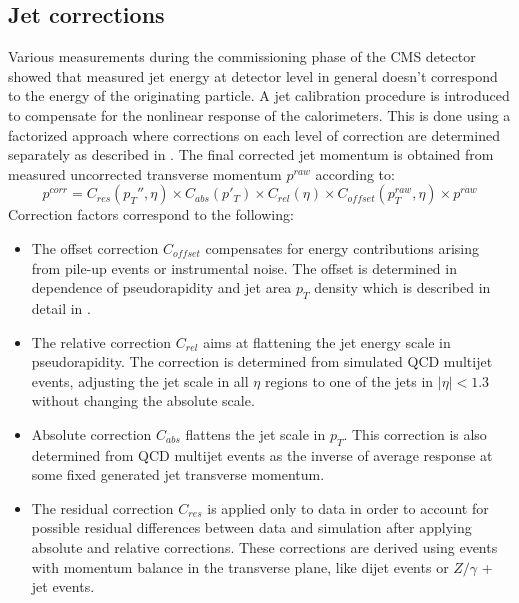 
\subsection{Jet corrections}
\label{sec:jetCorr}

Various measurements during the commissioning phase of the CMS detector showed that measured jet energy at detector level in general doesn't correspond to the energy of the originating particle. A jet calibration procedure is introduced to compensate for the nonlinear response of the calorimeters. This is done using a factorized approach where corrections on each level of correction are determined separately as described in \cite{Chatrchyan:2011ds}. The final corrected jet momentum is obtained from measured uncorrected transverse momentum $p^{raw}$ according to:
\begin{equation}
p^{corr} =  C_{res}(p_T'',\eta)\times  C_{abs}(p'_T) \times C_{rel}(\eta) \times C_{offset}(p_T^{raw},\eta)\times p^{raw}
\end{equation}  
Correction factors correspond to the following:
\begin{itemize}
\item The offset correction $C_{offset}$ compensates for energy contributions arising from pile-up events or instrumental noise. The offset is determined in dependence of pseudorapidity and jet area $p_T$ density which is described in detail in \cite{Cacciari2008119}.
\item The relative correction $C_{rel}$ aims at flattening the jet energy scale in pseudorapidity. The correction is determined from simulated QCD multijet events, adjusting the jet scale in all $\eta$ regions to one of the jets in $|\eta|<1.3$ without changing the absolute scale.
\item Absolute correction $C_{abs}$ flattens the jet scale in $p_T$. This correction is also determined from QCD multijet events as the inverse of average response at some fixed generated jet transverse momentum.
\item The residual correction $C_{res}$ is applied only to data in order to account for possible residual differences between data and simulation after applying absolute and relative corrections. These corrections are derived using events with momentum balance in the transverse plane, like dijet events or $Z/\gamma$ + jet events.
\end{itemize}   
